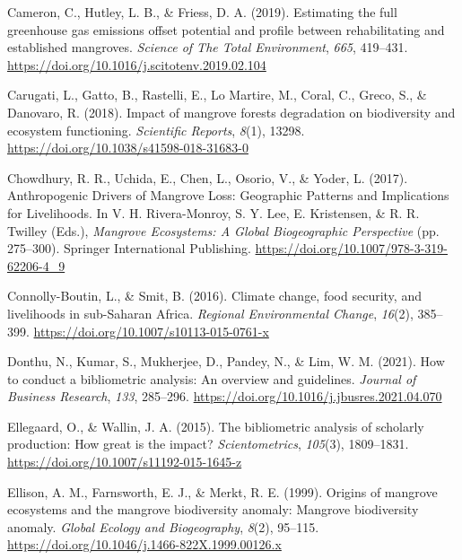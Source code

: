 \documentclass[
  12pt,
]{article}
\newlength{\cslhangindent}
\newlength{\cslentryspacingunit} %
\newenvironment{CSLReferences}[2] %
 {%
  \setlength{\parindent}{0pt}
  \ifodd #1
  \let\oldpar\par
  \def\par{\hangindent=\cslhangindent\oldpar}
  \fi
  \setlength{\parskip}{#2\cslentryspacingunit}
 }%
 {}
\begin{document}
\begin{CSLReferences}{1}{2}
\leavevmode{}%
Cameron, C., Hutley, L. B., \& Friess, D. A. (2019). Estimating the full greenhouse gas emissions offset potential and profile between rehabilitating and established mangroves. \emph{Science of The Total Environment}, \emph{665}, 419--431. \url{https://doi.org/10.1016/j.scitotenv.2019.02.104}

\leavevmode{}%
Carugati, L., Gatto, B., Rastelli, E., Lo Martire, M., Coral, C., Greco, S., \& Danovaro, R. (2018). Impact of mangrove forests degradation on biodiversity and ecosystem functioning. \emph{Scientific Reports}, \emph{8}(1), 13298. \url{https://doi.org/10.1038/s41598-018-31683-0}

\leavevmode{}%
Chowdhury, R. R., Uchida, E., Chen, L., Osorio, V., \& Yoder, L. (2017). Anthropogenic {Drivers} of {Mangrove Loss}: {Geographic Patterns} and {Implications} for {Livelihoods}. In V. H. Rivera-Monroy, S. Y. Lee, E. Kristensen, \& R. R. Twilley (Eds.), \emph{Mangrove {Ecosystems}: {A Global Biogeographic Perspective}} (pp. 275--300). Springer International Publishing. \url{https://doi.org/10.1007/978-3-319-62206-4_9}

\leavevmode{}%
Connolly-Boutin, L., \& Smit, B. (2016). Climate change, food security, and livelihoods in sub-{Saharan Africa}. \emph{Regional Environmental Change}, \emph{16}(2), 385--399. \url{https://doi.org/10.1007/s10113-015-0761-x}

\leavevmode{}%
Donthu, N., Kumar, S., Mukherjee, D., Pandey, N., \& Lim, W. M. (2021). How to conduct a bibliometric analysis: {An} overview and guidelines. \emph{Journal of Business Research}, \emph{133}, 285--296. \url{https://doi.org/10.1016/j.jbusres.2021.04.070}

\leavevmode{}%
Ellegaard, O., \& Wallin, J. A. (2015). The bibliometric analysis of scholarly production: {How} great is the impact? \emph{Scientometrics}, \emph{105}(3), 1809--1831. \url{https://doi.org/10.1007/s11192-015-1645-z}

\leavevmode{}%
Ellison, A. M., Farnsworth, E. J., \& Merkt, R. E. (1999). Origins of mangrove ecosystems and the mangrove biodiversity anomaly: {Mangrove} biodiversity anomaly. \emph{Global Ecology and Biogeography}, \emph{8}(2), 95--115. \url{https://doi.org/10.1046/j.1466-822X.1999.00126.x}


\end{CSLReferences}
\end{document}
